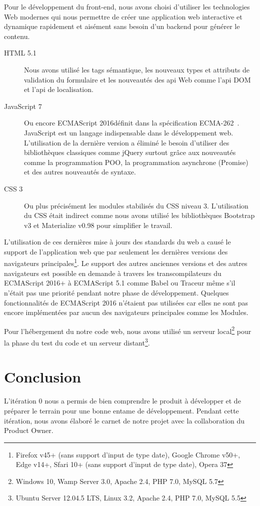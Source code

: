 Pour le développement du front-end, nous avons choisi d'utiliser les
technologies Web modernes qui nous permettre de créer une application web
interactive et dynamique rapidement et aisément sans besoin d'un backend pour
générer le contenu.

\begin{description}
    \item [HTML 5.1] Nous avons utilisé les tags sémantique, les nouveaux types
        et attributs de validation du formulaire et les nouveautés
        des api Web comme l'api DOM et l'api de localisation.
    \item [JavaScript 7] Ou encore ECMAScript 2016\textregistered définit dans
        la spécification ECMA-262~\cite{ECMA262}. JavaScript est un langage
        indispensable dans le développement web. L'utilisation de la dernière
        version a éliminé le besoin d'utiliser des bibliothèques classiques
        comme jQuery surtout grâce aux nouveautés comme la programmation POO,
        la programmation asynchrone (Promise) et des autres nouveautés de
        syntaxe.
    \item [CSS 3] Ou plus précisément les modules stabilisés du CSS niveau 3.
        L'utilisation du CSS était indirect comme nous avons
        utilisé les bibliothèques Bootstrap v3 et Materialize v0.98 pour
        simplifier le travail.
\end{description}

L'utilisation de ces dernières mise à jours des standards du web a causé le
support de l'application web que par seulement les dernières versions des
navigateurs principales\footnote{Firefox v45+ (sans support d'input de type
date), Google Chrome v50+, Edge v14+, Sfari 10+ (sans support d'input de type
date), Opera 37}. Le support des autres anciennes versions et des autres
navigateurs est possible en demande à travers les transcompilateurs du
ECMAScript 2016+ à ECMAScript 5.1 comme Babel ou Traceur même s'il n'était pas
une priorité pendant notre phase de développement. Quelques fonctionnalités de
ECMAScript 2016 n'étaient pas utilisées car elles ne sont pas encore
implémentées par aucun des navigateurs principales comme les Modules.

Pour l'hébergement du notre code web, nous avons utilisé un serveur
local\footnote{Windows 10, Wamp Server 3.0, Apache 2.4, PHP 7.0, MySQL 5.7}
pour la phase du test du code et un serveur distant\footnote{Ubuntu Server
12.04.5 LTS, Linux 3.2, Apache 2.4, PHP 7.0, MySQL 5.5}.

\section*{Conclusion}

L'itération 0 nous a permis de bien comprendre le produit à développer et de
préparer le terrain pour une bonne entame de développement. Pendant cette
itération, nous avons élaboré le carnet de notre projet avec la collaboration
du Product Owner.
